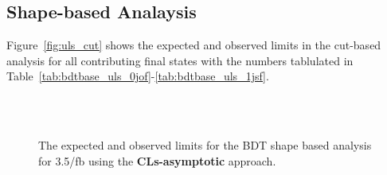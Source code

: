 \subsection{Shape-based Analaysis}
Figure~\ref{fig:uls_cut} shows the expected and observed limits in the cut-based analysis 
for all contributing final states with the numbers tablulated in Table~\ref{tab:bdtbase_uls_0jof}-\ref{tab:bdtbase_uls_1jsf}. 


\begin{figure}[!hbtp]
\centering
{}
\centering
{} \\
 \\
\label{fig:uls_shape}
\caption{The expected and observed limits for the BDT shape based analysis for 3.5/fb using the {\bf CLs-asymptotic} approach. }
\end{figure}

